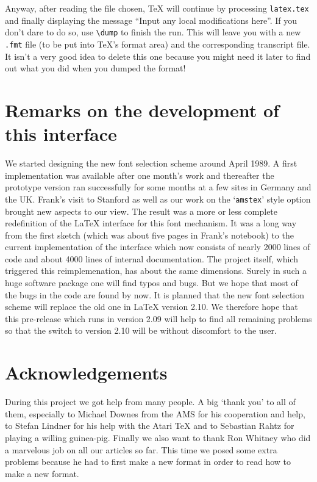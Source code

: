 Anyway, after reading the file chosen, \TeX{} will continue by
 processing {\tt latex.tex} and finally displaying the message ``Input
 any local modifications here''.  If you don't dare to do so, use
 \verb+\dump+ to finish the run.  This will leave you with a new {\tt
 .fmt} file (to be put into \TeX's format area) and the corresponding
 transcript file.  It isn't a very good idea to delete this one
 because you might need it later to find out what you did when you
 dumped the format!


 \section{Remarks on the development of this interface}

 We started designing the  new font selection scheme
 around April 1989.  A first implementation was
 available after one month's work and thereafter the
 prototype version ran successfully for some months at a
 few sites in Germany and the UK\null. Frank's visit to
 Stanford as well as our work on the `{\tt amstex}' style
 option brought new aspects to our view. The result was
 a more or less complete redefinition of the \LaTeX{}
 interface for this font mechanism.  It was a long way
 from the first sketch (which was about five pages in
 Frank's notebook) to the current implementation
 of
 the
 interface which now consists of nearly 2000 lines of code
 and about 4000 lines of internal documentation. The
 \AmSTeX{} project itself, which triggered this
 reimplemenation, has about the same dimensions. Surely
 in such a huge software package one will find typos
 and bugs. But we hope that most of the bugs in the
 code are found by now. It is planned that the new font selection
 scheme will replace the old one in \LaTeX{} version 2.10.
 We therefore hope that this pre-release which runs in version
 2.09 will help to find all remaining  problems so that the switch
 to version 2.10 will be without discomfort to the user.

 \section{Acknowledgements}
During this project we got help from many people. A big `thank you'
to all of them, especially to Michael Downes from the AMS for his
cooperation and help, to Stefan Lindner for his help with the
Atari \TeX{} and to Sebastian Rahtz for playing a willing
guinea-pig. Finally we also want to thank Ron Whitney who did a
marvelous job on all our articles so far. This time we posed some
extra problems because he had to first make a new format in
order to read how to make a new format.

